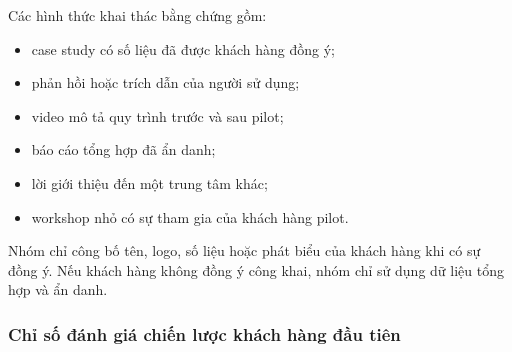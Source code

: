 Các hình thức khai thác bằng chứng gồm:

\begin{itemize}
    \item case study có số liệu đã được khách hàng đồng ý;
    \item phản hồi hoặc trích dẫn của người sử dụng;
    \item video mô tả quy trình trước và sau pilot;
    \item báo cáo tổng hợp đã ẩn danh;
    \item lời giới thiệu đến một trung tâm khác;
    \item workshop nhỏ có sự tham gia của khách hàng pilot.
\end{itemize}

Nhóm chỉ công bố tên, logo, số liệu hoặc phát biểu của khách hàng khi có sự đồng ý. Nếu khách hàng không đồng ý công khai, nhóm chỉ sử dụng dữ liệu tổng hợp và ẩn danh.

\subsubsection{Chỉ số đánh giá chiến lược khách hàng đầu tiên}

